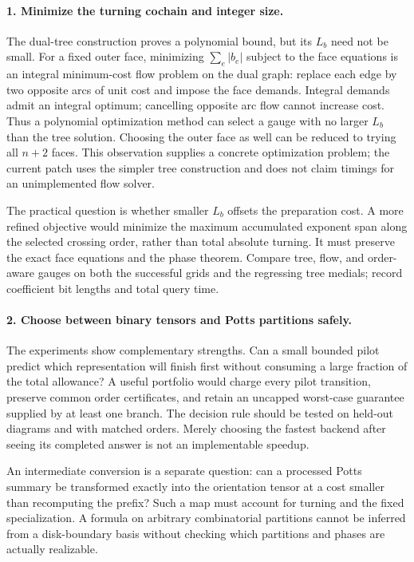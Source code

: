 \paragraph{1. Minimize the turning cochain and integer size.}
The dual-tree construction proves a polynomial bound, but its $L_b$ need
not be small. For a fixed outer face, minimizing $\sum_e|b_e|$ subject to
the face equations is an integral minimum-cost flow problem on the dual
graph: replace each edge by two opposite arcs of unit cost and impose the
face demands. Integral demands admit an integral optimum; cancelling
opposite arc flow cannot increase cost. Thus a polynomial optimization
method can select a gauge with no larger $L_b$ than the tree solution.
Choosing the outer face as well can be reduced to trying all $n+2$ faces.
This observation supplies a concrete optimization problem; the current
patch uses the simpler tree construction and does not claim timings for
an unimplemented flow solver.

The practical question is whether smaller $L_b$ offsets the preparation
cost. A more refined objective would minimize the maximum accumulated
exponent span along the selected crossing order, rather than total
absolute turning. It must preserve the exact face equations and the
phase theorem. Compare tree, flow, and order-aware gauges on both the
successful grids and the regressing tree medials; record coefficient bit
lengths and total query time.

\paragraph{2. Choose between binary tensors and Potts partitions safely.}
The experiments show complementary strengths. Can a small bounded pilot
predict which representation will finish first without consuming a large
fraction of the total allowance? A useful portfolio would charge every
pilot transition, preserve common order certificates, and retain an
uncapped worst-case guarantee supplied by at least one branch. The
decision rule should be tested on held-out diagrams and with matched
orders. Merely choosing the fastest backend after seeing its completed
answer is not an implementable speedup.

An intermediate conversion is a separate question: can a processed Potts
summary be transformed exactly into the orientation tensor at a cost
smaller than recomputing the prefix? Such a map must account for turning
and the fixed specialization. A formula on arbitrary combinatorial
partitions cannot be inferred from a disk-boundary basis without checking
which partitions and phases are actually realizable.

